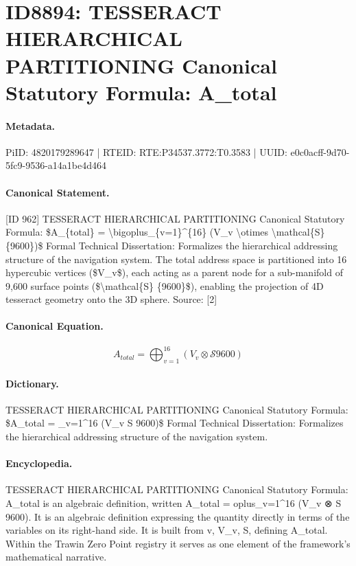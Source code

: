 \section*{ID8894: TESSERACT HIERARCHICAL PARTITIONING Canonical Statutory Formula: A\_total}
\paragraph{Metadata.}
PiID: 4820179289647 | RTEID: RTE:P34537.3772:T0.3583 | UUID: e0c0acff-9d70-5fc9-9536-a14a1be4d464

\paragraph{Canonical Statement.}
[ID 962] TESSERACT HIERARCHICAL PARTITIONING Canonical Statutory Formula: \$A\_\{total\} = \textbackslash{}bigoplus\_\{v=1\}\textasciicircum{}\{16\} (V\_v \textbackslash{}otimes \textbackslash{}mathcal\{S\} \{9600\})\$ Formal Technical Dissertation: Formalizes the hierarchical addressing structure of the navigation system. The total address space is partitioned into 16 hypercubic vertices (\$V\_v\$), each acting as a parent node for a sub-manifold of 9,600 surface points (\$\textbackslash{}mathcal\{S\} \{9600\}\$), enabling the projection of 4D tesseract geometry onto the 3D sphere. Source: [2]

\paragraph{Canonical Equation.}
\[
A_{total} = \bigoplus_{v=1}^{16} (V_v \otimes \mathcal{S} {9600})
\]

\paragraph{Dictionary.}
TESSERACT HIERARCHICAL PARTITIONING Canonical Statutory Formula: \$A\_total = \_v=1\textasciicircum{}16 (V\_v S 9600)\$ Formal Technical Dissertation: Formalizes the hierarchical addressing structure of the navigation system.

\paragraph{Encyclopedia.}
TESSERACT HIERARCHICAL PARTITIONING Canonical Statutory Formula: A\_total is an algebraic definition, written A\_total = oplus\_v=1\textasciicircum{}16 (V\_v ⊗ S 9600). It is an algebraic definition expressing the quantity directly in terms of the variables on its right-hand side. It is built from v, V\_v, S, defining A\_total. Within the Trawin Zero Point registry it serves as one element of the framework's mathematical narrative.

